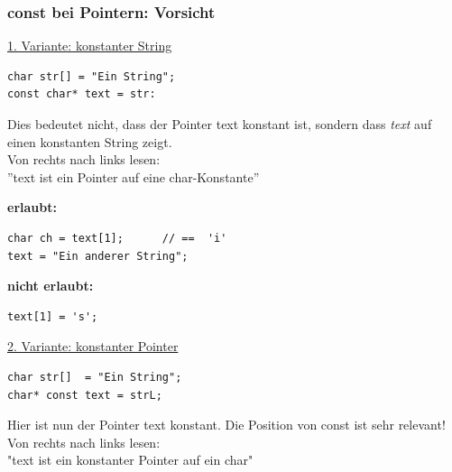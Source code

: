 \subsubsection{const bei Pointern: Vorsicht}
\underline{1. Variante: konstanter String}\\
\noindent
\begin{minipage}{0.35\linewidth}
\begin{lstlisting}
char str[] = "Ein String";
const char* text = str:
\end{lstlisting}
\end{minipage}
\hspace{0.01\linewidth}
\begin{minipage}{0.6\linewidth}
	Dies bedeutet nicht, dass der Pointer text konstant ist, sondern dass \emph{text} auf einen konstanten String zeigt.\\
	Von rechts nach links lesen:\\ ''text ist ein Pointer auf eine char-Konstante''
\end{minipage}

\noindent
\begin{minipage}{0.45\linewidth}
\textbf{erlaubt:}
\vspace{-\baselineskip}
\begin{lstlisting}
char ch = text[1];		// ==  'i'
text = "Ein anderer String";
\end{lstlisting}
\end{minipage}
\hspace{0.01\linewidth}
\begin{minipage}{0.2\linewidth}
\textbf{nicht erlaubt:}
\vspace{-\baselineskip}
\begin{lstlisting}
text[1] = 's';
\end{lstlisting}
\vfill\null
\end{minipage}

\underline{2. Variante: konstanter Pointer}\\
\noindent
\begin{minipage}{0.4\linewidth}
\vspace{-\baselineskip}
\begin{lstlisting}
char str[]  = "Ein String";
char* const text = strL;
\end{lstlisting}
\end{minipage}
\hspace{0.01\linewidth}
\begin{minipage}{0.6\linewidth}
Hier ist nun der Pointer text konstant. Die Position von const ist sehr relevant!\\
Von rechts nach links lesen:\\ "text ist ein konstanter Pointer auf ein char"
\end{minipage}

